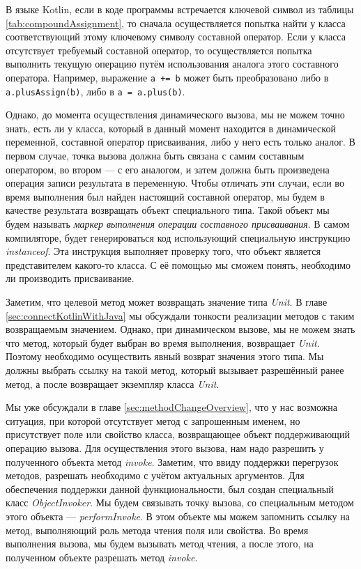 
В языке Kotlin, если в коде программы встречается ключевой символ из таблицы \ref{tab:compoundAssignment}, то сначала осуществляется попытка найти у класса соответствующий этому ключевому символу составной оператор. Если у класса отсутствует требуемый составной оператор, то осуществляется попытка выполнить текущую операцию путём использования аналога этого составного оператора. Например, выражение \texttt{a += b} может быть преобразовано либо в \texttt{a.plusAssign(b)}, либо в \texttt{a = a.plus(b)}. 

Однако, до момента осуществления динамического вызова, мы не можем точно знать, есть ли у класса, который в данный момент находится в динамической переменной, составной оператор присваивания, либо у него есть только аналог. В первом случае, точка вызова должна быть связана с самим составным оператором, во втором --- с его аналогом, и затем должна быть произведена операция записи результата в переменную. Чтобы отличать эти случаи, если во время выполнения был найден настоящий составной оператор, мы будем в качестве результата возвращать объект специального типа. Такой объект мы будем называть \textit{маркер выполнения операции составного присваивания}. 
В самом компиляторе, будет генерироваться код использующий специальную инструкцию \textit{instanceof}. Эта инструкция выполняет проверку того, что объект является представителем какого-то класса. С её помощью мы сможем понять, необходимо ли производить присваивание.


Заметим, что целевой метод может возвращать значение типа \textit{Unit}. В главе \ref{sec:connectKotlinWithJava} мы обсуждали тонкости реализации методов с таким возвращаемым значением. Однако, при динамическом вызове, мы не можем знать что метод, который будет выбран во время выполнения, возвращает \textit{Unit}. Поэтому необходимо осуществить явный возврат значения этого типа. Мы должны выбрать ссылку на такой метод, который вызывает разрешённый ранее метод, а после возвращает экземпляр класса \textit{Unit}.

Мы уже обсуждали в главе \ref{sec:methodChangeOverview}, что у нас возможна ситуация, при которой отсутствует метод с запрошенным именем, но присутствует поле или свойство класса, возвращающее объект поддерживающий операцию вызова.
Для осуществления этого вызова, нам надо разрешить у полученного объекта метод \textit{invoke}. Заметим, что ввиду поддержки перегрузок методов, разрешать необходимо с учётом актуальных аргументов. Для обеспечения поддержки данной функциональности, был создан специальный класс \textit{ObjectInvoker}. Мы будем связывать точку вызова, со специальным методом этого объекта --- \textit{performInvoke}. В этом объекте мы можем запомнить ссылку на метод, выполняющий роль метода чтения поля или свойства. Во время выполнения вызова, мы будем вызывать метод чтения, а после этого, на полученном объекте разрешать метод \textit{invoke}.


